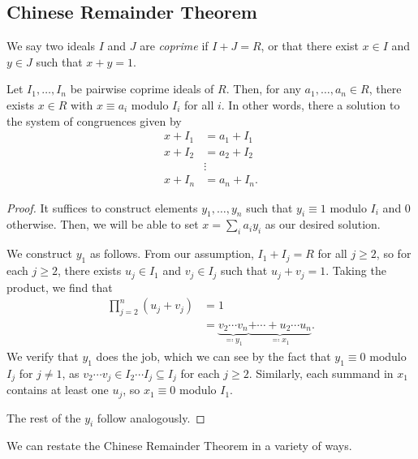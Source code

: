 \documentclass[10pt]{mypackage}
\begin{document}
\subsection{Chinese Remainder Theorem}%
\begin{definition}
  We say two ideals $I$ and $J$ are \textit{coprime} if $I + J = R$, or that there exist $x\in I$ and $y\in J$ such that $x + y = 1$.
\end{definition}
\begin{theorem}
  Let $I_1,\dots,I_n$ be pairwise coprime ideals of $R$. Then, for any $a_1,\dots,a_n\in R$, there exists $x\in R$ with $x\equiv a_i$ modulo $I_i$ for all $i$. In other words, there a solution to the system of congruences given by
  \begin{align*}
    x + I_1 &= a_1 + I_1\\
    x + I_2 &= a_2 + I_2\\
            &\vdots\\
    x + I_n &= a_n + I_n.
  \end{align*}
\end{theorem}
\begin{proof}
  It suffices to construct elements $y_1,\dots,y_n$ such that $y_i\equiv 1$ modulo $I_i$ and $0$ otherwise. Then, we will be able to set $x = \sum_{i} a_iy_i$ as our desired solution.%

  We construct $y_1$ as follows. From our assumption, $I_1 + I_j = R$ for all $j \geq 2$, so for each $j\geq 2$, there exists $u_j\in I_1$ and $v_j\in I_j$ such that $u_j + v_j = 1$. Taking the product, we find that
  \begin{align*}
    \prod_{j=2}^{n} \left( u_j + v_j \right) &= 1\\
                                             &= \underbrace{v_2 \cdots v_n}_{\eqcolon y_1} \underbrace{+ \cdots + u_2\cdots u_n}_{\eqcolon x_1}.
  \end{align*}
  We verify that $y_1$ does the job, which we can see by the fact that $y_1 \equiv 0$ modulo $I_j$ for $j\neq 1$, as $v_2\cdots v_j\in I_2\cdots I_j\subseteq I_j$ for each $j\geq 2$. Similarly, each summand in $x_1$ contains at least one $u_j$, so $x_1\equiv 0$ modulo $I_1$.%

  The rest of the $y_i$ follow analogously.
\end{proof}
We can restate the Chinese Remainder Theorem in a variety of ways.
\end{document}
